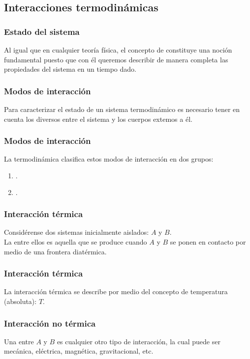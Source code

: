 \documentclass[12pt]{beamer}
\begin{document}
\subsection{Interacciones termodinámicas}

\begin{frame}
\frametitle{Estado del sistema}
Al igual que en cualquier teoría física, el concepto de  constituye una noción fundamental puesto que con él queremos describir de manera completa las propiedades del sistema en un tiempo dado.
\end{frame}
\begin{frame}
\frametitle{Modos de interacción}
Para caracterizar el estado de un sistema termodinámico es necesario tener en cuenta los diversos  entre el sistema y los cuerpos extemos a él.
\end{frame}
\begin{frame}
\frametitle{Modos de interacción}
La termodinámica clasifica estos modos de interacción en dos grupos:
\begin{enumerate}[<+->]
\item {}.
\item {}.
\end{enumerate}
\end{frame}
\begin{frame}
\frametitle{Interacción térmica}
Considérense dos sistemas inicialmente aislados: $A$ y $B$.
\\
\bigskip
\pause
La  entre ellos es aquella que se produce cuando $A$ y $B$ se ponen en contacto por medio de una frontera diatérmica. 
\end{frame}
\begin{frame}
\frametitle{Interacción térmica}
La interacción térmica se describe por medio del concepto de temperatura (absoluta): $T$.
\end{frame}
\begin{frame}
\frametitle{Interacción no térmica}
Una  entre $A$ y $B$ es cualquier otro tipo de interacción, \pause la cual puede ser mecánica,  eléctrica, magnética, gravitacional, etc.
\end{frame}
\end{document}

